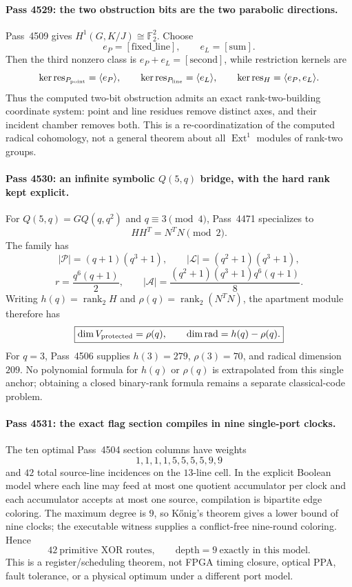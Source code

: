 \paragraph{Pass 4529: the two obstruction bits are the two parabolic directions.}
Pass~4509 gives $H^1(G,K/J)\cong\mathbb F_2^2$.  Choose
\[
 e_P=[\mathrm{fixed\_line}],\qquad e_L=[\mathrm{sum}].
\]
Then the third nonzero class is $e_P+e_L=[\mathrm{second}]$, while restriction
kernels are
\[
 \ker\operatorname{res}_{P_{\rm point}}=\langle e_P\rangle,\qquad
 \ker\operatorname{res}_{P_{\rm line}}=\langle e_L\rangle,\qquad
 \ker\operatorname{res}_{H}=\langle e_P,e_L\rangle.
\]
Thus the computed two-bit obstruction admits an exact rank-two-building
coordinate system: point and line residues remove distinct axes, and their
incident chamber removes both.  This is a re-coordinatization of the computed
radical cohomology, not a general theorem about all $\operatorname{Ext}^1$
modules of rank-two groups.

\paragraph{Pass 4530: an infinite symbolic $Q(5,q)$ bridge, with the hard rank kept explicit.}
For $Q(5,q)=GQ(q,q^2)$ and $q\equiv3\pmod4$, Pass~4471 specializes to
\[
 HH^T=N^TN\pmod2.
\]
The family has
\[
 |\mathcal P|=(q+1)(q^3+1),\qquad
 |\mathcal L|=(q^2+1)(q^3+1),
\]
\[
 r=\frac{q^6(q+1)}2,\qquad
 |\mathcal A|=\frac{(q^2+1)(q^3+1)q^6(q+1)}8.
\]
Writing $h(q)=\operatorname{rank}_2H$ and
$\rho(q)=\operatorname{rank}_2(N^TN)$, the apartment module therefore has
\[
 \boxed{\dim V_{\rm protected}=\rho(q),\qquad
 \dim\operatorname{rad}=h(q)-\rho(q).}
\]
For $q=3$, Pass~4506 supplies $h(3)=279$, $\rho(3)=70$, and radical dimension
$209$.  No polynomial formula for $h(q)$ or $\rho(q)$ is extrapolated from this
single anchor; obtaining a closed binary-rank formula remains a separate
classical-code problem.

\paragraph{Pass 4531: the exact flag section compiles in nine single-port clocks.}
The ten optimal Pass~4504 section columns have weights
\[
 1,1,1,1,5,5,5,5,9,9
\]
and $42$ total source-line incidences on the $13$-line cell.  In the explicit
Boolean model where each line may feed at most one quotient accumulator per
clock and each accumulator accepts at most one source, compilation is bipartite
edge coloring.  The maximum degree is $9$, so K\H{o}nig's theorem gives a lower
bound of nine clocks; the executable witness supplies a conflict-free
nine-round coloring.  Hence
\[
 \boxed{42\ \text{primitive XOR routes},\qquad \text{depth}=9\ \text{exactly in this model}.}
\]
This is a register/scheduling theorem, not FPGA timing closure, optical PPA,
fault tolerance, or a physical optimum under a different port model.

